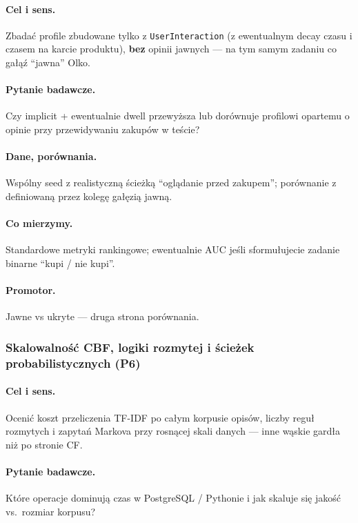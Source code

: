 \documentclass[a4paper,11pt]{article}
\newcommand{\code}[1]{\texttt{\small #1}}
\begin{document}
\paragraph{Cel i sens.}
Zbadać profile zbudowane tylko z \code{UserInteraction} (z ewentualnym decay czasu i czasem na karcie produktu), \textbf{bez} opinii jawnych --- na tym samym zadaniu co gałąź ``jawna'' Olko.

\paragraph{Pytanie badawcze.}
Czy implicit + ewentualnie dwell przewyższa lub dorównuje profilowi opartemu o opinie przy przewidywaniu zakupów w teście?

\paragraph{Dane, porównania.}
Wspólny seed z realistyczną ścieżką ``oglądanie przed zakupem''; porównanie z definiowaną przez kolegę gałęzią jawną.

\paragraph{Co mierzymy.}
Standardowe metryki rankingowe; ewentualnie AUC jeśli sformułujecie zadanie binarne ``kupi / nie kupi''.

\paragraph{Promotor.}
Jawne vs ukryte --- druga strona porównania.

\subsubsection{Skalowalność CBF, logiki rozmytej i ścieżek probabilistycznych (\textbf{P6})}

\paragraph{Cel i sens.}
Ocenić koszt przeliczenia TF-IDF po całym korpusie opisów, liczby reguł rozmytych i zapytań Markova przy rosnącej skali danych --- inne wąskie gardła niż po stronie CF.

\paragraph{Pytanie badawcze.}
Które operacje dominują czas w PostgreSQL / Pythonie i jak skaluje się jakość vs.\ rozmiar korpusu?
\end{document}
